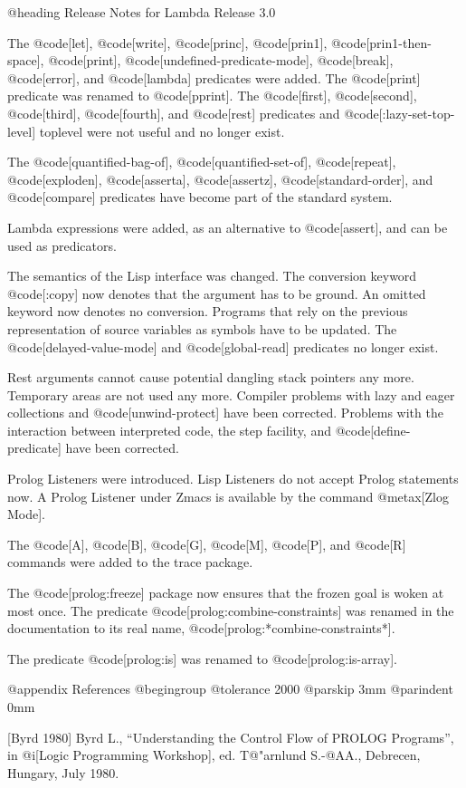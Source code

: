 {@heading Release Notes for Lambda Release 3.0

The @code[let], @code[write], @code[princ], @code[prin1],
@code[prin1-then-space], @code[print],
@code[undefined-predicate-mode], @code[break], @code[error], and
@code[lambda] predicates were added.  The @code[print] predicate was
renamed to @code[pprint].  The @code[first], @code[second],
@code[third], @code[fourth], and @code[rest] predicates and
@code[:lazy-set-top-level] toplevel were not useful and no longer
exist.

The @code[quantified-bag-of], @code[quantified-set-of], @code[repeat],
@code[exploden], @code[asserta], @code[assertz],
@code[standard-order], and @code[compare] predicates have become part
of the standard system.

Lambda expressions were added, as an alternative to @code[assert], and
can be used as predicators.

The semantics of the Lisp interface was changed.  The conversion
keyword @code[:copy] now denotes that the argument has to be ground.
An omitted keyword now denotes no conversion.  Programs that rely on
the previous representation of source variables as symbols have to be
updated.  The @code[delayed-value-mode] and @code[global-read]
predicates no longer exist.

Rest arguments cannot cause potential dangling stack pointers any more.
Temporary areas are not used any more.  Compiler problems with lazy
and eager collections and @code[unwind-protect] have been corrected.
Problems with the interaction between interpreted code, the step
facility, and @code[define-predicate] have been corrected.

Prolog Listeners were introduced.  Lisp Listeners do not accept Prolog
statements now.  A Prolog Listener under Zmacs is available by the
command @metax[Zlog Mode].

The @code[A], @code[B], @code[G], @code[M], @code[P], and @code[R]
commands were added to the trace package.

The @code[prolog:freeze] package now ensures that the frozen goal is
woken at most once.  The predicate @code[prolog:combine-constraints]
was renamed in the documentation to its real name,
@code[prolog:*combine-constraints*].

The predicate @code[prolog:is] was renamed to @code[prolog:is-array].

@appendix References
@begingroup
@tolerance 2000
@parskip 3mm
@parindent 0mm

[Byrd 1980] Byrd L.,
``Understanding the Control Flow of PROLOG Programs'', in 
@i[Logic Programming Workshop], ed. T@"arnlund S.-@AA.,
Debrecen, Hungary, July 1980.

}
